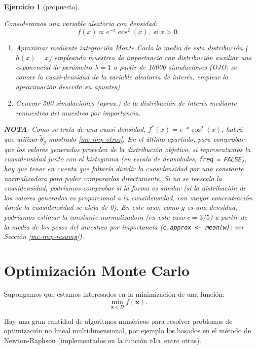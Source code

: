 \documentclass[
  spanish,
  10pt,
]{book}
\renewcommand{\mathbf}[1]{\symbf{#1}}
\theoremstyle{break}
\newtheorem{exercise}{Ejercicio}[chapter]
\theoremstyle{nonumberplain}
\begin{document}
\begin{exercise}[propuesto]
\protect\hypertarget{exr:mc-imp-sample2}{}\label{exr:mc-imp-sample2}

Consideramos una variable aleatoria con densidad:
\[f(x)\propto e^{-x}\cos^{2}(x),\text{ si }x>0.\]

\begin{enumerate}
\def\labelenumi{\alph{enumi}.}
\item
  Aproximar mediante integración Monte Carlo la media de esta
  distribución (\(h(x)=x\)) empleando muestreo de importancia con
  distribución auxiliar una exponencial de parámetro \(\lambda=1\) a
  partir de 10000 simulaciones (OJO: se conoce la cuasi-densidad
  de la variable aleatoria de interés, emplear la aproximación descrita
  en apuntes).
\item
  Generar 500 simulaciones (aprox.) de la distribución de interés
  mediante remuestreo del muestreo por importancia.
\end{enumerate}

\textbf{NOTA}: Como se trata de una cuasi-densidad, \(f^{\ast}(x) = e^{-x}\cos^{2}(x)\), habrá que utilizar \(\tilde{\theta}_{g}\) mostrado \ref{mc-imp-otros}.
En el último apartado, para comprobar que los valores generados proceden de la distribución objetivo, si representamos la cuasidensidad junto con el histograma (en escala de densidades, \texttt{freq\ =\ FALSE}), hay que tener en cuenta que faltaría dividir la cuasidensidad por una constante normalizadora para poder compararlos directamente.
Si no se reescala la cuasidensidad, podríamos comprobar si la forma es similar (si la distribución de los valores generados es proporcional a la cuasidensidad, con mayor concentración donde la cuasidensidad se aleja de 0).
En este caso, como \(g\) es una densidad, podríamos estimar la constante normalizadora (en este caso \(c = 3/5\)) a partir de la media de los pesos del muestreo por importancia (\texttt{c.approx\ \textless{}-\ mean(w)}; ver Sección \ref{mc-imp-resamp}).
\end{exercise}

\section{Optimización Monte Carlo}\label{opt-MC}

Supongamos que estamos interesados en la minimización de una función:
\[\underset{\mathbf{x}\in D}{\min }f(\mathbf{x}).\]

Hay una gran cantidad de algoritmos numéricos para resolver problemas de optimización no lineal multidimensional, por ejemplo los basados en el método de Newton-Raphson (implementados en la función \texttt{nlm}, entre otras).
\end{document}
